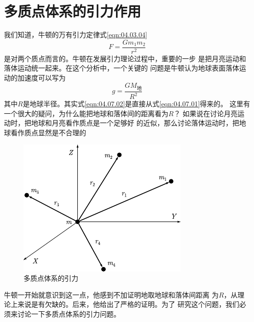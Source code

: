 \section{多质点体系的引力作用}\label{sec:04.07}

我们知道，牛顿的万有引力定律式\eqref{eqn:04.03.04}
\begin{equation}\label{eqn:04.07.01}
	F = \frac { G m _ { 1 } m _ { 2 } } { r ^ { 2 } }
\end{equation}
是对两个质点而言的。牛顿在发展引力理论过程中，重要的一步
是把月亮运动和落体运动统一起来。在这个分析中，一个关键的
问题是牛顿认为地球表面落体运动的加速度可以写为
\begin{equation}\label{eqn:04.07.02}
	g = \frac { G M _ \text{地} } { R ^ { 2 } }
\end{equation}
其中$ R $是地球半径。其实式\eqref{eqn:04.07.02}是直接从式\eqref{eqn:04.07.01}得来的。
这里有一个很大的疑问，为什么能把地球和落体间的距离看为$ R $？
如果说在讨论月亮运动时，把地球和月亮看作质点是一个足够好
的近似，那么讨论落体运动时，把地球看作质点显然是不合理的
\begin{figure}
	\centering
	\includegraphics{figure/fig04.09}
	\caption{多质点体系的引力}
	\label{fig:04.09}
\end{figure}
牛顿一开始就意识到这一点，他感到不加证明地取地球和落体间距离
为$ R $，从理论上来说是有欠缺的。后来，他给出了严格的证明。为了
研究这个问题，我们必须来讨论一下多质点体系的引力问题。

